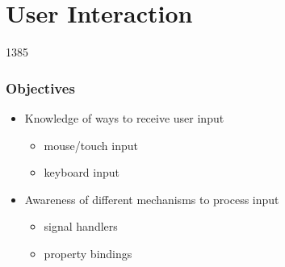 %
%
%
%

\section{User Interaction}

\begin{slide}{1385}\frametitle{Objectives}

\begin{itemize}
\item Knowledge of ways to receive user input
  \begin{itemize}
  \item mouse/touch input
  \item keyboard input
  \end{itemize}
\item Awareness of different mechanisms to process input
  \begin{itemize}
  \item signal handlers
  \item property bindings
  \end{itemize}
\end{itemize}

\end{slide}    






